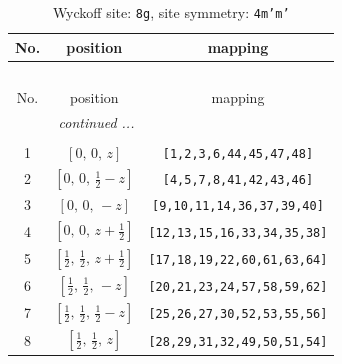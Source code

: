 \documentclass[fleqn,8pt]{jsarticle}
\begin{document}
\begin{longtable}{ccc}
\caption{Wyckoff site: {\tt 8g}, site symmetry: {\tt 4m'm'}}
 \\
 \hline \hline
No. & position & mapping \\ \hline \endfirsthead

\multicolumn{2}{l}{\tablename\ \thetable{}} \\
 \hline \hline
No. & position & mapping \\ \hline \endhead

 \hline \hline
\multicolumn{2}{r}{\footnotesize\it continued ...} \\ \endfoot

 \hline \hline
\multicolumn{2}{r}{} \\ \endlastfoot

1 & $\left[ 0,\, 0,\, z \right]$ & {\tt [1,2,3,6,44,45,47,48]} \\ \hline
2 & $\left[ 0,\, 0,\, \frac{1}{2} - z \right]$ & {\tt [4,5,7,8,41,42,43,46]} \\ \hline
3 & $\left[ 0,\, 0,\, - z \right]$ & {\tt [9,10,11,14,36,37,39,40]} \\ \hline
4 & $\left[ 0,\, 0,\, z + \frac{1}{2} \right]$ & {\tt [12,13,15,16,33,34,35,38]} \\ \hline
5 & $\left[ \frac{1}{2},\, \frac{1}{2},\, z + \frac{1}{2} \right]$ & {\tt [17,18,19,22,60,61,63,64]} \\ \hline
6 & $\left[ \frac{1}{2},\, \frac{1}{2},\, - z \right]$ & {\tt [20,21,23,24,57,58,59,62]} \\ \hline
7 & $\left[ \frac{1}{2},\, \frac{1}{2},\, \frac{1}{2} - z \right]$ & {\tt [25,26,27,30,52,53,55,56]} \\ \hline
8 & $\left[ \frac{1}{2},\, \frac{1}{2},\, z \right]$ & {\tt [28,29,31,32,49,50,51,54]} \\
\end{longtable}
\renewcommand{\arraystretch}{1.2}
\end{document}

